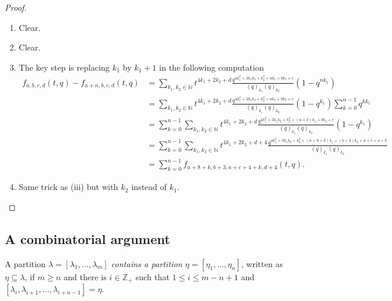 \documentclass[a4paper, 12pt, reqno]{amsart}
\theoremstyle{remark}
\begin{document}
\begin{proof}\leavevmode
  \begin{enumerate}
  \item Clear.
  \item Clear.
  \item The key step is replacing $k_1$ by $k_1 + 1$ in the following computation
    \begin{align*}
      f_{a, b, c, d}(t, q) - f_{a + n, b, c, d}(t, q) &= \sum_{k_1, k_2 \in \mathbb{N}}t^{4k_1 + 2k_2 + d}\frac{q^{4k_1^2 + 3k_1k_2 + k_2^2 + ak_1 + bk_2 + c}}{(q)_{k_1}(q)_{k_2}}(1 - q^{nk_1}) \\
                                                      &= \sum_{k_1, k_2 \in \mathbb{N}}t^{4k_1 + 2k_2 + d}\frac{q^{4k_1^2 + 3k_1k_2 + k_2^2 + ak_1 + bk_2 + c}}{(q)_{k_1}(q)_{k_2}}(1 - q^{k_1})\sum_{k = 0}^{n - 1}q^{kk_1} \\
                                                      &= \sum_{k = 0}^{n - 1}\sum_{k_1, k_2 \in \mathbb{N}}t^{4k_1 + 2k_2 + d}\frac{q^{4k_1^2 + 3k_1k_2 + k_2^2 + (a + k)k_1 + bk_2 + c}}{(q)_{k_1}(q)_{k_2}}(1 - q^{k_1}) \\
                                                      &= \sum_{k = 0}^{n - 1}\sum_{k_1, k_2 \in \mathbb{N}}t^{4k_1 + 2k_2 + d + 4}\frac{q^{4k_1^2 + 3k_1k_2 + k_2^2 + (a + 8 + k)k_1 + (b + 3)k_2 + a + c + 4 + k}}{(q)_{k_1}(q)_{k_2}} \\
                                                      &= \sum_{k = 0}^{n - 1}f_{a + 8 + k, b + 3, a + c + 4 + k, d + 4}(t, q).
    \end{align*}
  \item Same trick as (iii) but with $k_2$ instead of $k_1$. \qedhere
  \end{enumerate}
\end{proof}

\subsection{A combinatorial argument}
\label{sec:comb-argum}

A partition $\lambda = [\lambda_1, \dots, \lambda_m]$ \emph{contains a partition} $\eta = [\eta_1, \dots, \eta_n]$, written as $\eta \subseteq \lambda$, if $m \ge n$ and there is $i \in \mathbb{Z}_+$ such that $1 \le i \le m - n + 1$ and $[\lambda_i, \lambda_{i + 1}, \dots, \lambda_{i + n - 1}] = \eta$.
\end{document}
